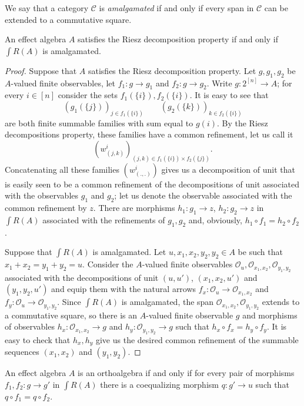 \documentclass[smallextended]{svjour3}
\begin{document}
We say that a category ${\mathcal{C}}$ is {\em amalgamated} if and only if 
every span in ${\mathcal{C}}$ can be extended to a commutative square.
\begin{theorem}\label{thm:rdpisamalgamated}
An effect algebra $A$ satisfies the Riesz decomposition property if and only if 
${\int R({A})}$ is amalgamated.
\end{theorem}
\begin{proof}
Suppose that $A$ satisfies the Riesz decomposition property. Let $g,g_1,g_2$ be
$A$-valued finite observables, let $f_1:g\to g_1$ and $f_2:g\to g_2$. Write
$g:2^{[n]}\to A$; for every $i\in [n]$ consider the sets $f_1(\{i\}),f_2(\{i\})$. It is easy
to see that 
$$
(g_1(\{j\}))_{j\in f_1(\{i\})}
\qquad
(g_2(\{k\}))_{k\in f_2(\{i\})}
$$
are both finite summable families with sum equal to $g(i)$. By the Riesz
decompositions property, these families have a common refinement, let
us call it 
$$
(w^i_{(j,k)})_{(j,k)\in f_1(\{i\})\times f_2(\{j\})}.
$$ 
Concatenating all these families $(w^i_{(.,.)})$ gives us a decomposition
of unit that is easily seen to be a common refinement of the decompositions
of unit associated with the observables $g_1$ and $g_2$; let us denote
the observable associated with the common refinement by $z$.
There are morphisms $h_1:g_1\to z$, $h_2:g_2\to z$ in ${\int R({A})}$ associated
with the refinements of $g_1,g_2$
and, obviously, $h_1\circ f_1=h_2\circ f_2$.

Suppose that ${\int R({A})}$ is amalgamated. Let $u,x_1,x_2,y_2,y_2\in A$ be such
that $x_1+x_2=y_1+y_2=u$. Consider the $A$-valued finite observables
${\mathcal O_{{u}}},{\mathcal O_{{x_1,x_2}}},{\mathcal O_{{y_1,y_2}}}$ associated with the decompositions of unit
$(u,u')$, $(x_1,x_2,u')$ and $(y_1,y_2,u')$ and equip them with the natural
arrows $f_x:{\mathcal O_{{u}}}\to {\mathcal O_{{x_1,x_2}}}$ and $f_y:{\mathcal O_{{u}}}\to {\mathcal O_{{y_1,y_2}}}$.  Since
${\int R({A})}$ is amalgamated, the span ${\mathcal O_{{x_1,x_2}}},{\mathcal O_{{y_1,y_2}}}$ extends to a
commutative square, so there is an $A$-valued finite observable $g$ and
morphisms of observables $h_x:{\mathcal O_{{x_1,x_2}}}\to g$ and $h_y:{\mathcal O_{{y_1,y_2}}}\to g$ such
that $h_x\circ f_x=h_y\circ f_y$. It is easy to check that $h_x,h_y$ give us the
desired common refinement of the summable sequences $(x_1,x_2)$ and $(y_1,y_2)$.
\end{proof}
\begin{theorem}
\label{thm:oacoequalizes}
An effect algebra $A$ is an orthoalgebra if and only if
for every pair of morphisms $f_1,f_2:g\to g'$ in ${\int R({A})}$
there is a coequalizing morphism $q:g'\to u$ such that $q\circ f_1=q\circ f_2$. 
\end{theorem}
\end{document}
